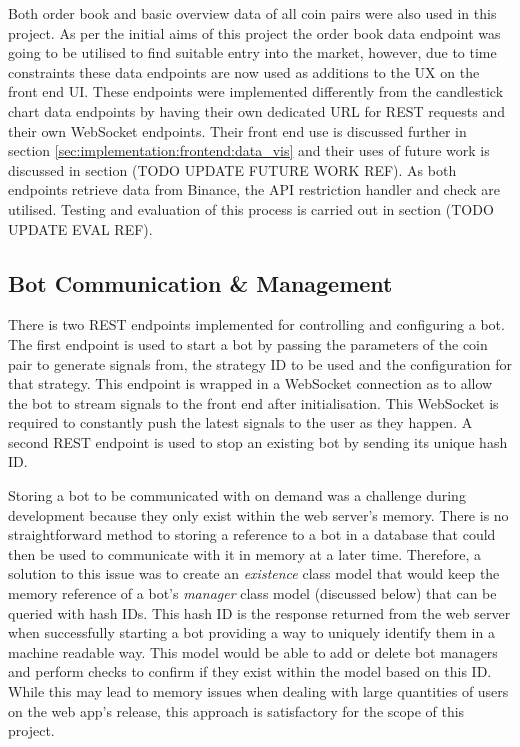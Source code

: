 Both order book and basic overview data of all coin pairs were also used in this project. As per the initial aims of this project the order book data endpoint was going to be utilised to find suitable entry into the market, however, due to time constraints these data endpoints are now used as additions to the UX on the front end UI. These endpoints were implemented differently from the candlestick chart data endpoints by having their own dedicated URL for REST requests and their own WebSocket endpoints. Their front end use is discussed further in section \ref{sec:implementation:frontend:data_vis} and their uses of future work is discussed in section (TODO UPDATE FUTURE WORK REF). As both endpoints retrieve data from Binance, the API restriction handler and check are utilised. Testing and evaluation of this process is carried out in section (TODO UPDATE EVAL REF).

\subsection{Bot Communication \& Management}
\label{sec:implementation:info_comm:bot_comm_management}

\noindent There is two REST endpoints implemented for controlling and configuring a bot. The first endpoint is used to start a bot by passing the parameters of the coin pair to generate signals from, the strategy ID to be used and the configuration for that strategy. This endpoint is wrapped in a WebSocket connection as to allow the bot to stream signals to the front end after initialisation. This WebSocket is required to constantly push the latest signals to the user as they happen. A second REST endpoint is used to stop an existing bot by sending its unique hash ID.

Storing a bot to be communicated with on demand was a challenge during development because they only exist within the web server's memory. There is no straightforward method to storing a reference to a bot in a database that could then be used to communicate with it in memory at a later time. Therefore, a solution to this issue was to create an \textit{existence} class model that would keep the memory reference of a bot's \textit{manager} class model (discussed below) that can be queried with hash IDs. This hash ID is the response returned from the web server when successfully starting a bot providing a way to uniquely identify them in a machine readable way. This model would be able to add or delete bot managers and perform checks to confirm if they exist within the model based on this ID. While this may lead to memory issues when dealing with large quantities of users on the web app's release, this approach is satisfactory for the scope of this project. 

